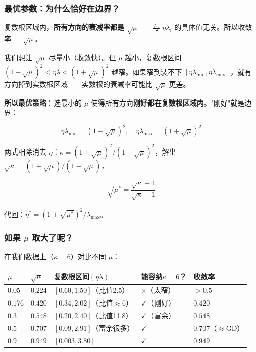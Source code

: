 \documentclass[12pt,a4paper]{article}
\begin{document}
\subsubsection{最优参数：为什么恰好在边界？}

复数根区域内，\textbf{所有方向的衰减率都是 $\sqrt\mu$}——与 $\eta\lambda_i$ 的具体值无关。所以收敛率 $= \sqrt\mu$。

我们想让 $\sqrt\mu$ 尽量小（收敛快）。但 $\mu$ 越小，复数根区间 $(1-\sqrt\mu)^2 < \eta\lambda < (1+\sqrt\mu)^2$ 越窄。如果窄到装不下 $[\eta\lambda_{\min}, \eta\lambda_{\max}]$，就有方向掉到实数根区域——实数根的衰减率可能比 $\sqrt\mu$ 更差。

\textbf{所以最优策略}：选最小的 $\mu$ 使得所有方向\textbf{刚好都在复数根区域内}。"刚好"就是边界：

\[\eta\lambda_{\min} = (1-\sqrt\mu)^2, \quad \eta\lambda_{\max} = (1+\sqrt\mu)^2\]

两式相除消去 $\eta$：$\kappa = (1+\sqrt\mu)^2/(1-\sqrt\mu)^2$，解出 $\sqrt\kappa = (1+\sqrt\mu)/(1-\sqrt\mu)$，

\[\boxed{\sqrt{\mu^*} = \frac{\sqrt\kappa - 1}{\sqrt\kappa + 1}}\]

代回：$\eta^* = (1+\sqrt{\mu^*})^2/\lambda_{\max}$。

\subsubsection{如果 $\mu$ 取大了呢？}

在我们数据上（$\kappa = 6$）对比不同 $\mu$：

\begin{center}\small
\begin{longtable}{|l|l|l|l|l|}
\hline
$\mu$ & $\sqrt\mu$ & 复数根区间$(\eta\lambda)$ & 能容纳$\kappa=6$？ & 收敛率 \\
\hline
$0.05$ & $0.224$ & $[0.60, 1.50]$（比值2.5） & $\times$（太窄） & $>0.5$  \\
$\mathbf{0.176}$ & $\mathbf{0.420}$ & $[0.34, 2.02]$（比值$\approx 6$） & $\checkmark$（刚好） & $\mathbf{0.420}$  \\
$0.3$ & $0.548$ & $[0.20, 2.40]$（比值11.8） & $\checkmark$（富余） & $0.548$  \\
$0.5$ & $0.707$ & $[0.09, 2.91]$（富余很多） & $\checkmark$ & $0.707$（$\approx$GD）\\
$0.9$ & $0.949$ & $[0.003, 3.80]$ & $\checkmark$ & $0.949$  \\
\hline
\end{longtable}
\end{center}
\end{document}
